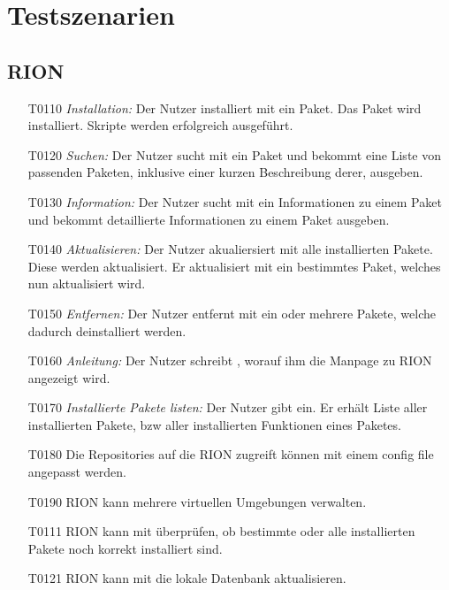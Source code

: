 \chapter{Testszenarien}

\section{RION}

\begin{itemize}
	\item[T0110] \textit{Installation:} Der Nutzer installiert mit  ein Paket. Das Paket wird installiert. Skripte werden erfolgreich ausgeführt.
	\item[T0120] \textit{Suchen:} Der Nutzer sucht mit  ein Paket und bekommt eine Liste von passenden Paketen, inklusive einer kurzen Beschreibung derer, ausgeben.
	\item[T0130] \textit{Information:} Der Nutzer sucht mit  ein Informationen zu einem Paket und bekommt detaillierte Informationen zu einem Paket ausgeben.
	\item[T0140] \textit{Aktualisieren:} Der Nutzer akualiersiert mit  alle installierten Pakete. Diese werden aktualisiert. Er aktualisiert mit  ein bestimmtes Paket, welches nun aktualisiert wird.

	\item[T0150] \textit{Entfernen:} Der Nutzer entfernt mit  ein oder mehrere Pakete, welche dadurch deinstalliert werden.
	\item[T0160] \textit{Anleitung:} Der Nutzer schreibt , worauf ihm die Manpage zu RION angezeigt wird.
	\item[T0170] \textit{Installierte Pakete listen:} Der Nutzer gibt  ein. Er erhält Liste aller installierten Pakete, bzw aller installierten Funktionen eines Paketes.
	\item[T0180] Die Repositories auf die RION zugreift können mit einem config file angepasst werden.
	\item[T0190] RION kann mehrere virtuellen Umgebungen verwalten.
	\item[T0111] RION kann mit 	 überprüfen, ob bestimmte oder alle installierten Pakete noch korrekt installiert sind.
	\item[T0121] RION kann mit  die lokale Datenbank aktualisieren.

\end{itemize}

